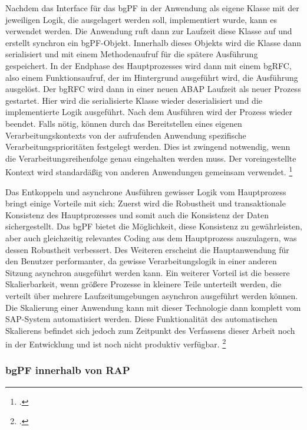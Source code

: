Nachdem das Interface für das bgPF in der Anwendung als eigene Klasse mit der jeweiligen Logik, die ausgelagert werden soll, implementiert wurde, kann es verwendet werden. Die Anwendung ruft dann zur Laufzeit diese Klasse auf und erstellt synchron ein bgPF-Objekt. Innerhalb dieses Objekts wird die Klasse dann serialisiert und mit einem Methodenaufruf für die spätere Ausführung gespeichert. In der Endphase des Hauptprozesses wird dann mit einem bgRFC, also einem Funktionsaufruf, der im Hintergrund ausgeführt wird, die Ausführung ausgelöst. Der bgRFC wird dann in einer neuen ABAP Laufzeit als neuer Prozess gestartet. Hier wird die serialisierte Klasse wieder deserialisiert und die implementierte Logik ausgeführt. Nach dem Ausführen wird der Prozess wieder beendet. Falls nötig, können durch das Bereitstellen eines eigenen Verarbeitungskontexts von der aufrufenden Anwendung spezifische Verarbeitungsprioritäten festgelegt werden. Dies ist zwingend notwendig, wenn die Verarbeitungsreihenfolge genau eingehalten werden muss. Der voreingestellte Kontext wird standardä{\ss}ig von anderen Anwendungen gemeinsam verwendet. \footcite[Vgl.][]{sap_bgpf_2023}

Das Entkoppeln und asynchrone Ausführen gewisser Logik vom Hauptprozess bringt einige Vorteile mit sich: Zuerst wird die Robustheit und transaktionale Konsistenz des Hauptprozesses und somit auch die Konsistenz der Daten sichergestellt. Das bgPF bietet die Möglichkeit, diese Konsistenz zu gewährleisten, aber auch gleichzeitig relevantes Coding aus dem Hauptprozess auszulagern, was dessen Robustheit verbessert. Des Weiteren erscheint die Hauptanwendung für den Benutzer performanter, da gewisse Verarbeitungslogik in einer anderen Sitzung asynchron ausgeführt werden kann. Ein weiterer Vorteil ist die bessere Skalierbarkeit, wenn grö{\ss}ere Prozesse in kleinere Teile unterteilt werden, die verteilt über mehrere Laufzeitumgebungen asynchron ausgeführt werden können. Die Skalierung einer Anwendung kann mit dieser Technologie dann komplett vom SAP-System automatisiert werden. Diese Funktionalität des automatischen Skalierens befindet sich jedoch zum Zeitpunkt des Verfassens dieser Arbeit noch in der Entwicklung und ist noch nicht produktiv verfügbar. \footcite[Vgl.][]{sap_bgpf_2023}

\subsubsection{bgPF innerhalb von RAP}

